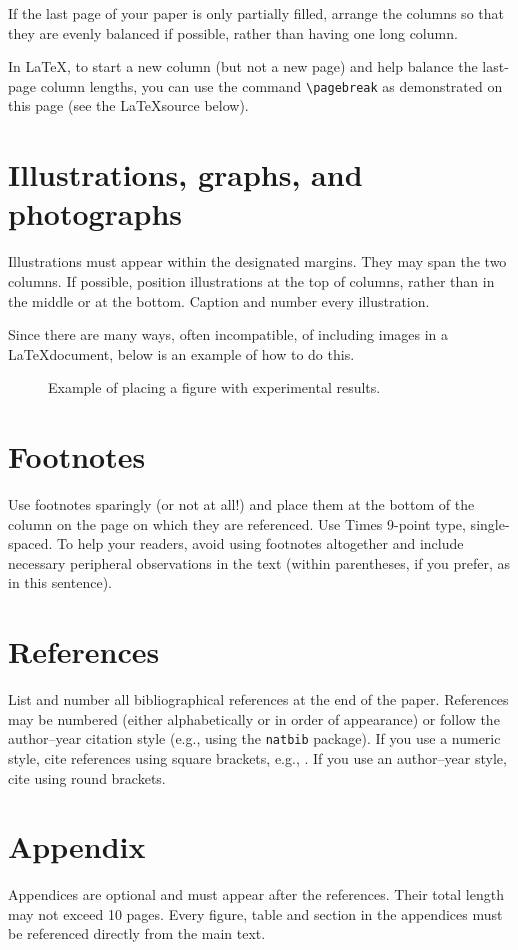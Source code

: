 \documentclass{article}
\begin{document}
If the last page of your paper is only partially filled, arrange the columns so that they are evenly balanced if possible, rather than having one long column.

In \LaTeX, to start a new column (but not a new page) and help balance the last-page column lengths, you can use the command \verb|\pagebreak| as demonstrated on this page (see the \LaTeX source below).

\section{Illustrations, graphs, and photographs}
\label{sec:illust}

Illustrations must appear within the designated margins. They may span the two columns. If possible, position illustrations at the top of columns, rather than in the middle or at the bottom. Caption and number every illustration.

Since there are many ways, often incompatible, of including images in a \LaTeX document, below is an example of how to do this.

\begin{figure}[htb]
\fbox{\rule{0pt}{4cm}\rule{0.97\columnwidth}{0pt}}
\caption{Example of placing a figure with experimental results.}
\label{fig:res}
\end{figure}

\vfill
\pagebreak

\section{Footnotes}
\label{sec:foot}

Use footnotes sparingly (or not at all!) and place them at the bottom of the column on the page on which they are referenced. Use Times 9-point type, single-spaced. To help your readers, avoid using footnotes altogether and include necessary peripheral observations in the text (within parentheses, if you prefer, as in this sentence).

\section{References}
\label{sec:ref}

List and number all bibliographical references at the end of the paper. References may be numbered (either alphabetically or in order of appearance) or follow the author–year citation style (e.g., using the \texttt{natbib} package). If you use a numeric style, cite references using square brackets, e.g., \cite{C2}. If you use an author–year style, cite using round brackets.




\newpage
\appendix

\section{Appendix}

Appendices are optional and must appear after the references. Their total length may not exceed 10 pages. Every figure, table and section in the appendices must be referenced directly from the main text.
\end{document}
